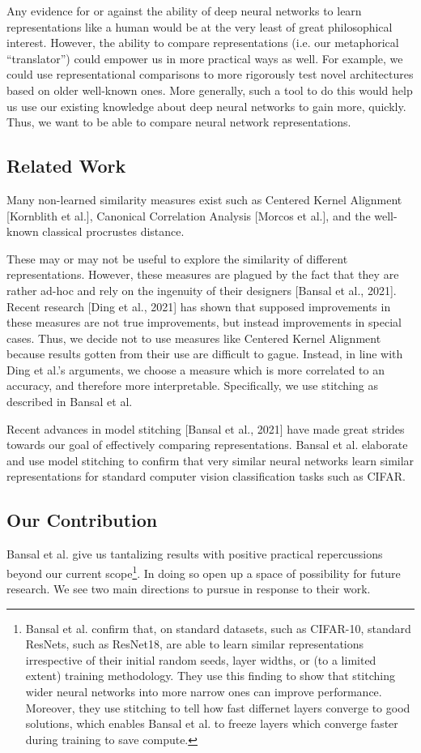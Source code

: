 \documentclass{article} %
\begin{document}
Any evidence for or against the ability of deep neural networks to learn representations like a human would be at the
very least of great philosophical interest. However, the ability to compare representations (i.e. our metaphorical
``translator'') could empower us in more practical ways as well. For example, we could use representational comparisons
to more rigorously test novel architectures based on older well-known ones. More generally, such a tool to do this
would help us use our existing knowledge about deep neural networks to gain more, quickly. Thus, we want to be
able to compare neural network representations.

\subsection*{Related Work}
Many non-learned similarity measures exist such as Centered Kernel Alignment [Kornblith et al.],
Canonical Correlation Analysis [Morcos et al.], and the well-known classical procrustes distance.

These may or may not be useful to explore the similarity of different representations. However, these measures are
plagued by the fact that they are rather ad-hoc and rely on the ingenuity of their designers [Bansal et al., 2021].
Recent research [Ding et al., 2021] has shown that supposed improvements in these measures are not true improvements,
but instead improvements in special cases. Thus, we decide not to use measures like Centered Kernel
Alignment because results gotten from
their use are difficult to gague. Instead, in line with Ding et al.'s arguments, we choose a measure which is more correlated
to an accuracy, and therefore more interpretable. Specifically, we use stitching as described in Bansal et al.

Recent advances in model stitching [Bansal et al., 2021] have made great strides towards our goal of effectively
comparing representations. Bansal et al. elaborate and use model stitching to confirm that very similar 
neural networks learn similar representations for
standard computer vision classification tasks such as CIFAR.


\subsection*{Our Contribution}
Bansal et al. give us tantalizing results with positive practical repercussions beyond our current scope\footnote{
   Bansal et al. confirm that, on standard datasets, such as CIFAR-10, standard ResNets, such as ResNet18, are able to learn similar
   representations irrespective of their initial random seeds, layer widths, or (to a limited extent) training methodology.
   They use this finding to show that stitching wider neural networks into more narrow ones can improve performance. Moreover,
   they use stitching to tell how fast differnet layers converge to good solutions, which enables Bansal et al. to freeze
   layers which converge faster during training to save compute.
}.
In doing so open up a space of possibility for future research. We see two main directions to pursue in response
to their work.
\end{document}
